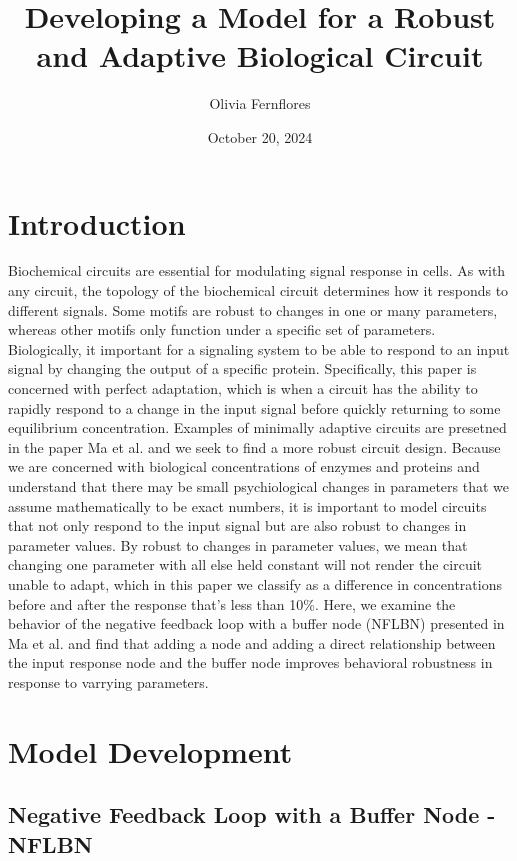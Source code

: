 \documentclass{article}
\title{Developing a Model for a Robust and Adaptive Biological Circuit}
\author{Olivia Fernflores}
\date{October 20, 2024}
\begin{document}
\maketitle

\section{Introduction}
Biochemical circuits are essential for modulating signal response in cells. As with any circuit, the topology of the biochemical circuit determines how it responds to different signals. Some motifs are robust to changes in one or many parameters, whereas other motifs only function under a specific set of parameters. Biologically, it important for a signaling system to be able to respond to an input signal by changing the output of a specific protein. Specifically, this paper is concerned with perfect adaptation, which is when a circuit has the ability to rapidly respond to a change in the input signal before quickly returning to some equilibrium concentration. Examples of minimally adaptive circuits are presetned in the paper Ma et al. \cite{challenge2paperD2L} and we seek to find a more robust circuit design. Because we are concerned with biological concentrations of enzymes and proteins and understand that there may be small psychiological changes in parameters that we assume mathematically to be exact numbers, it is important to model circuits that not only respond to the input signal but are also robust to changes in parameter values. By robust to changes in parameter values, we mean that changing one parameter with all else held constant will not render the circuit unable to adapt, which in this paper we classify as a difference in concentrations before and after the response that's less than 10\%. Here, we examine the behavior of the negative feedback loop with a buffer node (NFLBN) presented in Ma et al. \cite{challenge2paperD2L} and find that adding a node and adding a direct relationship between the input response node and the buffer node improves behavioral robustness in response to varrying parameters. 

\section{Model Development}

\subsection{Negative Feedback Loop with a Buffer Node - NFLBN}
\end{document}
